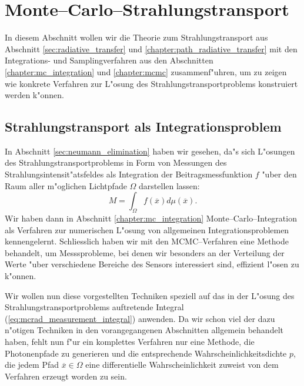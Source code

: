	\chapter{Monte--Carlo--Strahlungstransport}\label{sec:mc_radiativetransfer}
	In diesem Abschnitt wollen wir die Theorie zum Strahlungstransport aus Abschnitt \ref{sec:radiative_transfer} und \ref{chapter:path_radiative_transfer} mit den Integrations- und Samplingverfahren aus den Abschnitten \ref{chapter:mc_integration} und \ref{chapter:mcmc} zusammenf"uhren, um zu zeigen wie konkrete Verfahren zur L"osung des Strahlungstransportproblems konstruiert werden k"onnen.
	\section{Strahlungstransport als Integrationsproblem}
	In Abschnitt \ref{sec:neumann_elimination} haben wir gesehen, da"s sich L"osungen des Strahlungstransportproblems in Form von Messungen des Strahlungsintensit"atsfeldes als Integration der Beitragsmessfunktion $f$ "uber den Raum aller m"oglichen Lichtpfade $\Omega$ darstellen lassen:
	\begin{equation}
		M=\int_\Omega f({\overline x})d\mu({\overline x}).
		\label{eq:mcrad_measurement_integral}
	\end{equation}
	Wir haben dann in Abschnitt \ref{chapter:mc_integration} Monte--Carlo--Integration als Verfahren zur numerischen L"osung von allgemeinen Integrationsproblemen kennengelernt. Schliesslich haben wir mit den MCMC--Verfahren eine Methode behandelt, um Messsprobleme, bei denen wir besonders an der Verteilung der Werte "uber verschiedene Bereiche des Sensors interessiert sind, effizient l"osen zu k"onnen.
	
	Wir wollen nun diese vorgestellten Techniken speziell auf das in der L"osung des Strahlungstransportproblems auftretende Integral (\ref{eq:mcrad_measurement_integral}) anwenden. Da wir schon viel der dazu n"otigen Techniken in den vorangegangenen Abschnitten allgemein behandelt haben, fehlt nun f"ur ein komplettes Verfahren nur eine Methode, die Photonenpfade zu generieren und die entsprechende Wahrscheinlichkeitsdichte $p$, die jedem Pfad ${\overline x}\in\Omega$ eine differentielle Wahrscheinlichkeit zuweist von dem Verfahren erzeugt worden zu sein.
	
